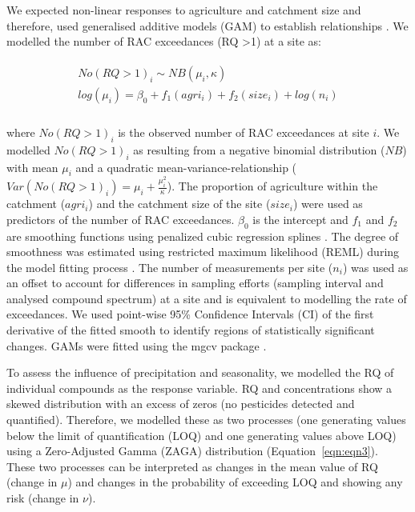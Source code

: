 We expected non-linear responses to agriculture and catchment size and therefore, used generalised additive models (GAM) to establish relationships \citep{fewster_analysis_2000}.
We modelled the number of RAC exceedances (RQ \textgreater 1) at a site as:

\begin{align}
\begin{split}
  No(RQ > 1)_i \sim NB(\mu_i, \kappa) \\
  log(\mu_i)= \beta_0 + f_1(agri_i) + f_2(size_i) + log(n_i) \\
\end{split}
\end{align}

where $No(RQ > 1)_i$ is the observed number of RAC exceedances at site $i$. 
We modelled $No(RQ > 1)_i$ as resulting from a negative binomial distribution ($NB$) with mean $\mu_i$ and a quadratic mean-variance-relationship ($Var(No(RQ > 1)_i) = \mu_i + \frac{\mu_i^2}{\kappa}$).
The proportion of agriculture within the catchment ($agri_i$) and the catchment size of the site ($size_i$) were used as predictors of the number of RAC exceedances. 
$\beta_0$ is the intercept and $f_1$ and $f_2$ are smoothing functions using penalized cubic regression splines \citep{wood_generalized_2006}. 
The degree of smoothness was estimated using restricted maximum likelihood (REML) during the model fitting process \citep{wood_fast_2011}.
The number of measurements per site ($n_i$) was used as an offset to account for differences in sampling efforts (sampling interval and analysed compound spectrum) at a site and is equivalent to modelling the rate of exceedances. 
We used point-wise 95\% Confidence Intervals (CI) of the first derivative of the fitted smooth to identify regions of statistically significant changes.
GAMs were fitted using the mgcv package \citep{wood_fast_2011}.

To assess the influence of precipitation and seasonality, we modelled the RQ of individual compounds as the response variable.
RQ and concentrations show a skewed distribution with an excess of zeros (no pesticides detected and quantified). 
Therefore, we modelled these as two processes (one generating values below the limit of quantification (LOQ) and one generating values above LOQ) using a Zero-Adjusted Gamma (ZAGA) distribution \citep{rigby_generalized_2005,stasinopoulos_gamlss.dist:_2016} (Equation~\ref{eqn:eqn3}).
These two processes can be interpreted as changes in the mean value of RQ (change in $\mu$) and changes in the probability of exceeding LOQ and showing any risk (change in $\nu$).

